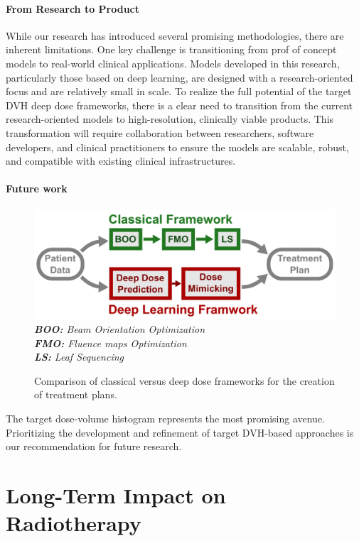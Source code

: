 \paragraph{From Research to Product}
While our research has introduced several promising methodologies, there are inherent limitations.
One key challenge is transitioning from prof of concept models to real-world clinical applications.
Models developed in this research, particularly those based on deep learning, are designed with a research-oriented focus and are relatively small in scale.
To realize the full potential of the target DVH deep dose frameworks, there is a clear need to transition from the current research-oriented models to high-resolution, clinically viable products.
This transformation will require collaboration between researchers, software developers, and clinical practitioners to ensure the models are scalable, robust, and compatible with existing clinical infrastructures.

\paragraph{Future work}
\begin{figure}
	\includegraphics[width=\linewidth]{frameworks.pdf}
	\textit{
		\textbf{BOO:} Beam Orientation Optimization\\
		\textbf{FMO:} Fluence maps Optimization\\
		\textbf{LS:} Leaf Sequencing
	}
	\caption{Comparison of classical versus deep dose frameworks for the creation of treatment plans.}
	\label{fig:frameworks_comparison}
\end{figure}

The target dose-volume histogram represents the most promising avenue.
Prioritizing the development and refinement of target DVH-based approaches is our recommendation for future research.

\section{Long-Term Impact on Radiotherapy}
